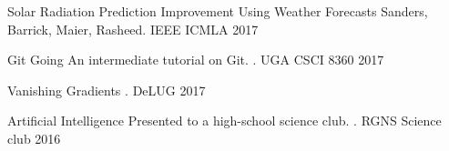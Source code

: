 
\begin{cvhonors}

\cvhonor
{Solar Radiation Prediction Improvement Using Weather Forecasts}
{Sanders, Barrick, Maier, Rasheed.}
{IEEE ICMLA}
{2017}

\end{cvhonors}


\begin{cvhonors}

\cvhonor
{Git Going}
{An intermediate tutorial on Git. .}
{UGA CSCI 8360}
{2017}

\cvhonor
{Vanishing Gradients}
{.}
{DeLUG}
{2017}

\cvhonor
{Artificial Intelligence}
{Presented to a high-school science club. .}
{RGNS Science club}
{2016}

\end{cvhonors}
